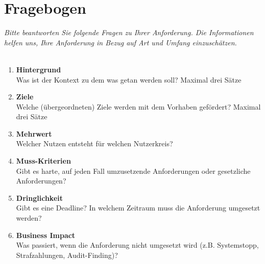 \section{Fragebogen}
\textit{Bitte beantworten Sie folgende Fragen zu Ihrer Anforderung. Die Informationen helfen uns, Ihre Anforderung in Bezug auf Art und Umfang einzuschätzen. \\ \\
}

\begin{Form}
  \begin{enumerate}
  	\item \textbf{Hintergrund} \\
  	Was ist der Kontext zu dem was getan werden soll? Maximal drei Sätze \\
  	\TextField[multiline, name=background,width=0.9\textwidth,  height=2cm, value={} ]{}
  	
  	\item \textbf{Ziele} \\
  	Welche (übergeordneten) Ziele werden mit dem Vorhaben gefördert? Maximal drei Sätze  \\
  	\TextField[multiline, name=goal,width=0.9\textwidth,  height=2cm, value={} ]{}
  	
  	\item \textbf{Mehrwert} \\
  	Welcher Nutzen entsteht für welchen Nutzerkreis? \\
  	\TextField[multiline, name=value,width=0.9\textwidth,  height=2cm, value={} ]{}
  	
  	\item \textbf{Muss-Kriterien} \\
  	Gibt es harte, auf jeden Fall umzusetzende Anforderungen oder gesetzliche Anforderungen?   \\
  	\TextField[multiline, name=must,width=0.9\textwidth,  height=2cm, value={} ]{}
  	
  	\item \textbf{Dringlichkeit } \\
  Gibt es eine Deadline? In welchem Zeitraum muss die Anforderung umgesetzt werden? \\
  	\TextField[multiline, name=priority,width=0.9\textwidth,  height=2cm, value={} ]{}
  	\newpage
  	\item \textbf{Business Impact} \\
  	Was passiert, wenn die Anforderung nicht umgesetzt wird (z.B. Systemstopp, Strafzahlungen, Audit-Finding)?   \\
  	\TextField[multiline, name=business,width=0.9\textwidth,  height=2cm, value={}]{}
  	

\end{enumerate}
\end{Form}
